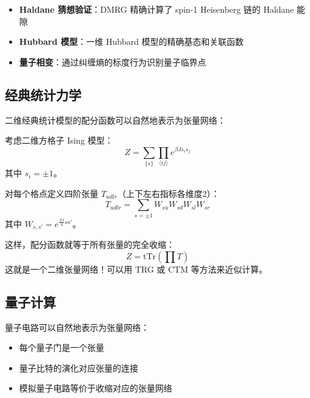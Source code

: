 \documentclass[12pt,a4paper]{ctexart}
\begin{document}
\begin{examplebox}
\begin{itemize}
    \item \textbf{Haldane 猜想验证}：DMRG 精确计算了 spin-1 Heisenberg 链的 Haldane 能隙
    \item \textbf{Hubbard 模型}：一维 Hubbard 模型的精确基态和关联函数
    \item \textbf{量子相变}：通过纠缠熵的标度行为识别量子临界点
\end{itemize}
\end{examplebox}

\subsection{经典统计力学}

二维经典统计模型的配分函数可以自然地表示为张量网络：

\begin{examplebox}
考虑二维方格子 Ising 模型：
\[
Z = \sum_{\{s\}} \prod_{\langle ij \rangle} e^{\beta J s_i s_j}
\]
其中 $s_i = \pm 1$。

对每个格点定义四阶张量 $T_{udlr}$（上下左右指标各维度2）：
\[
T_{udlr} = \sum_{s=\pm 1} W_{su} W_{sd} W_{sl} W_{sr}
\]
其中 $W_{s,s'} = e^{\frac{\beta J}{4} s s'}$。

这样，配分函数就等于所有张量的完全收缩：
\[
Z = \text{tTr}\left(\prod T\right)
\]
这就是一个二维张量网络！可以用 TRG 或 CTM 等方法来近似计算。
\end{examplebox}

\subsection{量子计算}

量子电路可以自然地表示为张量网络：
\begin{itemize}
    \item 每个量子门是一个张量
    \item 量子比特的演化对应张量的连接
    \item 模拟量子电路等价于收缩对应的张量网络
\end{itemize}
\end{document}
